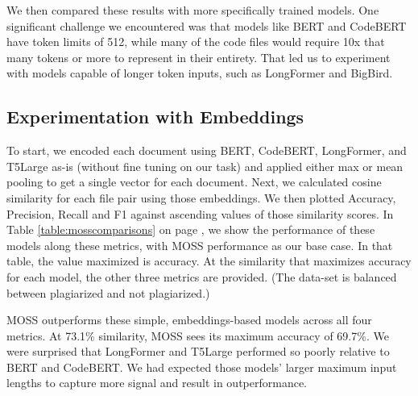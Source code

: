 \documentclass[twocolumn]{article}
\begin{document}
We then compared these results with more specifically trained models. One significant challenge we encountered was that models like BERT and CodeBERT have token limits of 512, while many of the code files would require 10x that many tokens or more to represent in their entirety. That led us to experiment with models capable of longer token inputs, such as LongFormer and BigBird. 

\subsection{\normalsize Experimentation with Embeddings}

To start, we encoded each document using BERT, CodeBERT, LongFormer, and T5Large as-is (without fine tuning on our task) and applied either max or mean pooling to get a single vector for each document. Next, we calculated cosine similarity for each file pair using those embeddings. We then plotted Accuracy, Precision, Recall and F1 against ascending values of those similarity scores. In Table \ref{table:mosscomparisons}  on page \pageref{table:mosscomparisons}, we show the performance of these models along these metrics, with MOSS performance as our base case. In that table, the value maximized is accuracy. At the similarity that maximizes accuracy for each model, the other three metrics are provided. (The data-set is balanced between plagiarized and not plagiarized.)

MOSS outperforms these simple, embeddings-based models across all four metrics. At 73.1\% similarity, MOSS sees its maximum accuracy of 69.7\%. We were surprised that LongFormer and T5Large performed so poorly relative to BERT and CodeBERT. We had expected those models' larger maximum input lengths to capture more signal and result in outperformance. 
\end{document}
